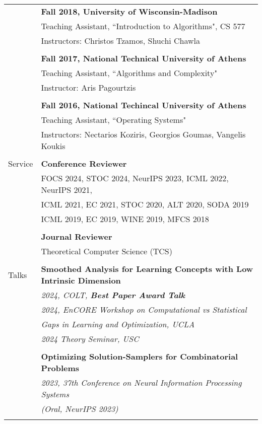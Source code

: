 \documentclass[letterpaper,11pt,oneside]{article}
\begin{document}
\begin{longtable}{@{} l l}
&\textbf{Fall 2018, University of Wisconsin-Madison} \\
& Teaching Assistant, ``Introduction to Algorithms", CS 577 \\
& Instructors: Christos Tzamos, Shuchi Chawla \\
& \\

&\textbf{Fall 2017, National Technical University of Athens} \\
& Teaching Assistant, ``Algorithms and Complexity" \\
& Instructor: Aris Pagourtzis \\
& \\

&\textbf{Fall 2016, National Techincal University of Athens} \\
& Teaching Assistant, ``Operating Systems" \\
& Instructors: Nectarios Koziris, Georgios Goumas, Vangelis Koukis\\
& \\

  \Large{Service} &\textbf{Conference Reviewer}\\

    & FOCS 2024, STOC 2024, NeurIPS 2023, ICML 2022, NeurIPS 2021, \\ 
    & ICML 2021, EC 2021, STOC 2020, ALT 2020, SODA 2019 \\ 
    & ICML 2019, EC 2019, WINE 2019, MFCS 2018 \\
    &\\

    &\textbf{Journal Reviewer}\\
    & Theoretical Computer Science (TCS)\\
    & \\

 \Large{Talks}

 &\textbf{Smoothed Analysis for Learning Concepts with Low Intrinsic Dimension} \\
 & \emph{2024, COLT, \textbf{Best Paper Award Talk}} \\
 &\emph{2024, EnCORE Workshop on Computational vs Statistical} \\
 & \emph{Gaps in Learning and Optimization, UCLA} \\
 & \emph{2024 Theory Seminar, USC} \\
 & \\

 &\textbf{Optimizing Solution-Samplers for Combinatorial Problems}  \\
 &\emph{2023, 37th Conference on Neural Information Processing Systems} \\
 & \emph{(Oral, NeurIPS 2023)} \\
 & \\


\end{longtable}
\end{document}

